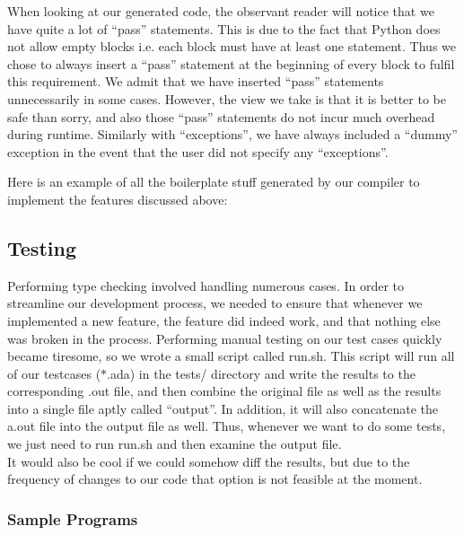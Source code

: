 \documentclass[onecolumn,11pt]{article}
\begin{document}
When looking at our generated code, the observant reader will notice that we have quite a lot of ``pass'' statements. This is due to the fact that Python does not allow empty blocks i.e. each block must have at least one statement. Thus we chose to always insert a ``pass'' statement at the beginning of every block to fulfil this requirement. We admit that we have inserted ``pass'' statements unnecessarily in some cases. However, the view we take is that it is better to be safe than sorry, and also those ``pass'' statements do not incur much overhead during runtime. Similarly with ``exceptions'', we have always included a ``dummy'' exception in the event that the user did not specify any ``exceptions''.

Here is an example of all the boilerplate stuff generated by our compiler to implement the features discussed above: \\

\begin{alltt}
\end{alltt}

\subsection{Testing}
Performing type checking involved handling numerous cases. In order to streamline our development process, we needed to ensure that whenever we implemented a new feature, the feature did indeed work, and that nothing else was broken in the process. Performing manual testing on our test cases quickly became tiresome, so we wrote a small script called run.sh. This script will run all of our testcases ($\ast$.ada) in the tests/ directory and write the results to the corresponding .out file, and then combine the original file as well as the results into a single file aptly called ``output''. In addition, it will also concatenate the a.out file into the output file as well. Thus, whenever we want to do some tests, we just need to run run.sh and then examine the output file. \\

It would also be cool if we could somehow diff the results, but due to the frequency of changes to our code that option is not feasible at the moment.

\subsubsection{Sample Programs}
\end{document}

